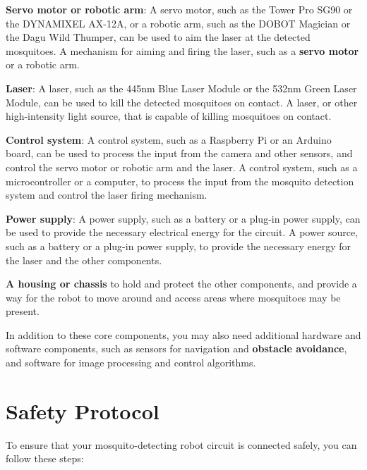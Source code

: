 \documentclass[11pt]{article}
\begin{document}
\begin{itemize}
	
		\textbf{Servo motor or robotic arm}: A servo motor, such as the Tower Pro SG90 or the DYNAMIXEL AX-12A, or a robotic arm, such as the DOBOT Magician or the Dagu Wild Thumper, can be used to aim the laser at the detected mosquitoes.	A mechanism for aiming and firing the laser, such as a \textbf{servo motor} or a robotic arm.
	
	\textbf{Laser}: A laser, such as the 445nm Blue Laser Module or the 532nm Green Laser Module, can be used to kill the detected mosquitoes on contact.	A laser, or other high-intensity light source, that is capable of killing mosquitoes on contact.
	
	\textbf{Control system}: A control system, such as a Raspberry Pi or an Arduino board, can be used to process the input from the camera and other sensors, and control the servo motor or robotic arm and the laser.	A control system, such as a microcontroller or a computer, to process the input from the mosquito detection system and control the laser firing mechanism.
	
	\textbf{Power supply}: A power supply, such as a battery or a plug-in power supply, can be used to provide the necessary electrical energy for the circuit.
		A power source, such as a battery or a plug-in power supply, to provide the necessary energy for the laser and the other components.
	
	
	

	

	

	
\textbf{	A housing or chassis} to hold and protect the other components, and provide a way for the robot to move around and access areas where mosquitoes may be present.
	
	In addition to these core components, you may also need additional hardware and software components, such as sensors for navigation and \textbf{obstacle avoidance}, and software for image processing and control algorithms.
	
	
	
	
		\end{itemize}
		


	

	
	
	
\section{Safety Protocol}

	
	To ensure that your mosquito-detecting robot circuit is connected safely, you can follow these steps:
	
\end{document}
